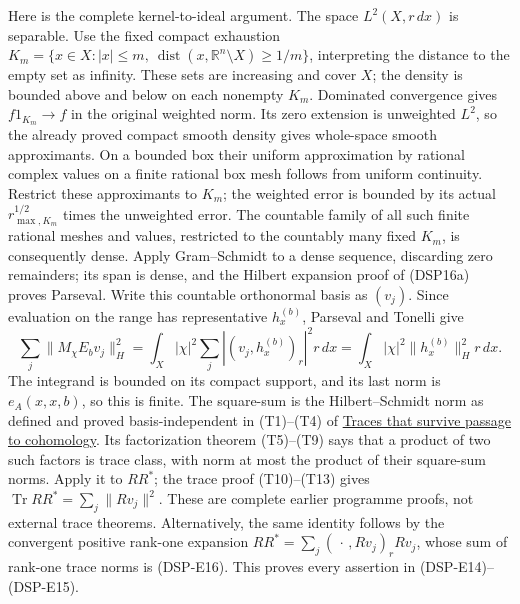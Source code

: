 \documentclass[
  11pt,
]{article}
\begin{document}
Here is the complete kernel-to-ideal argument. The space
\(L^2(X,r\,dx)\) is separable. Use the fixed compact exhaustion
\(K_m=\{x\in X:|x|\leq m,\ \operatorname{dist}(x,\mathbb R^n\setminus X)\geq1/m\}\),
interpreting the distance to the empty set as infinity. These sets are
increasing and cover \(X\); the density is bounded above and below on
each nonempty \(K_m\). Dominated convergence gives \(f1_{K_m}\to f\) in
the original weighted norm. Its zero extension is unweighted \(L^2\), so
the already proved compact smooth density gives whole-space smooth
approximants. On a bounded box their uniform approximation by rational
complex values on a finite rational box mesh follows from uniform
continuity. Restrict these approximants to \(K_m\); the weighted error
is bounded by its actual \(r_{\max,K_m}^{1/2}\) times the unweighted
error. The countable family of all such finite rational meshes and
values, restricted to the countably many fixed \(K_m\), is consequently
dense. Apply Gram--Schmidt to a dense sequence, discarding zero
remainders; its span is dense, and the Hilbert expansion proof of
(DSP16a) proves Parseval. Write this countable orthonormal basis as
\((v_j)\). Since evaluation on the range has representative
\(h_x^{(b)}\), Parseval and Tonelli give \[
 \sum_j\|M_\chi E_bv_j\|_H^2
 =\int_X|\chi|^2\sum_j|(v_j,h_x^{(b)})_r|^2r\,dx
 =\int_X|\chi|^2\|h_x^{(b)}\|_H^2r\,dx.
 \tag{DSP-E16}
\] The integrand is bounded on its compact support, and its last norm is
\(e_A(x,x,b)\), so this is finite. The square-sum is the
Hilbert--Schmidt norm as defined and proved basis-independent in
(T1)--(T4) of \href{traces-and-complexes.pdf}{Traces that survive passage
to cohomology}. Its factorization theorem (T5)--(T9) says that a product
of two such factors is trace class, with norm at most the product of
their square-sum norms. Apply it to \(RR^*\); the trace proof
(T10)--(T13) gives \(\operatorname{Tr}RR^*=\sum_j\|Rv_j\|^2\). These are
complete earlier programme proofs, not external trace theorems.
Alternatively, the same identity follows by the convergent positive
rank-one expansion \(RR^*=\sum_j (\,\cdot\,,Rv_j)_r Rv_j\), whose sum of
rank-one trace norms is (DSP-E16). This proves every assertion in
(DSP-E14)--(DSP-E15).
\end{document}
